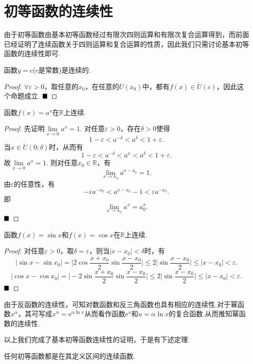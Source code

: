 \section{初等函数的连续性}
由于初等函数由基本初等函数经过有限次四则运算和有限次复合运算得到，而前面已经证明了连续函数关于四则运算和复合运算的性质，因此我们只需讨论基本初等函数的连续性即可.
\begin{proposition}[常量函数]
	函数$y=c$\quad ($c$是常数)是连续的.
\end{proposition}
\begin{proof}
	$\forall\varepsilon>0$，取任意的$x_0$，在任意的$\mathring{U}(x_0)$中，都有$f(x)\in\mathring{U}(c)$，因此这个命题成立. $\hfill\blacksquare$
\end{proof}
\begin{proposition}[指数函数]
函数$f(x)=a^x$在$\mathbb{R}$上连续.
\end{proposition}
\begin{proof}
先证明$\lim\limits_{x\to 0}a^x=1.$
对任意$\varepsilon>0$，存在$\delta>0$使得
$$1-\varepsilon<a^{-\delta}<a^{\delta}<1+\varepsilon.$$
当$x\in\mathring{U}(0;\delta)$时，从而有
$$1-\varepsilon<a^{-\delta}<a^x<a^{\delta}<1+\varepsilon.$$
故$\lim\limits_{x\to 0}a^x=1.$
则对任意$x_0\in\mathbb{R}$，有
$$\lim\limits_{x\to x_0}a^{x-x_0}=1.$$
由$\varepsilon$的任意性，有
$$-\varepsilon a^{-x_0}<a^{x-x_0}-1<\varepsilon a^{-x_0}.$$
即$$\lim\limits_{x\to x_0}a^x=a^x_0.$$
$\hfill\blacksquare$
\end{proof}
\begin{proposition}[三角函数]
函数$f(x)=\sin x$和$f(x)=\cos x$在$\mathbb{R}$上连续.
\end{proposition}
\begin{proof}
对任意$\varepsilon>0$，取$\delta=\varepsilon$，则当$|x-x_0|<\delta$时，有
$$|\sin x-\sin x_0|=\big|2\cos \frac{x+x_0}{2}\sin\frac{x-x_0}{2}\big|\leqslant2\big|\sin\frac{x-x_0}{2}\big|\leqslant|x-x_0|<\varepsilon.$$
$$|\cos x-\cos x_0|=\big|-2\sin \frac{x+x_0}{2}\sin\frac{x-x_0}{2}\big|\leqslant2\big|\sin\frac{x-x_0}{2}\big|\leqslant|x-x_0|<\varepsilon.$$
$\hfill\blacksquare$
\end{proof}
由于反函数的连续性，可知对数函数和反三角函数也具有相应的连续性.对于幂函数$x^\alpha$，其可写成$x^\alpha=\text{e}^{\alpha\ln x}$从而看作函数$\text{e}^u$和$u=\alpha\ln x$的复合函数.从而推知幂函数的连续性.

以上我们完成了基本初等函数连续性的证明，于是有下述定理.
\begin{theorem}
任何初等函数都是在其定义区间的连续函数.
\end{theorem}